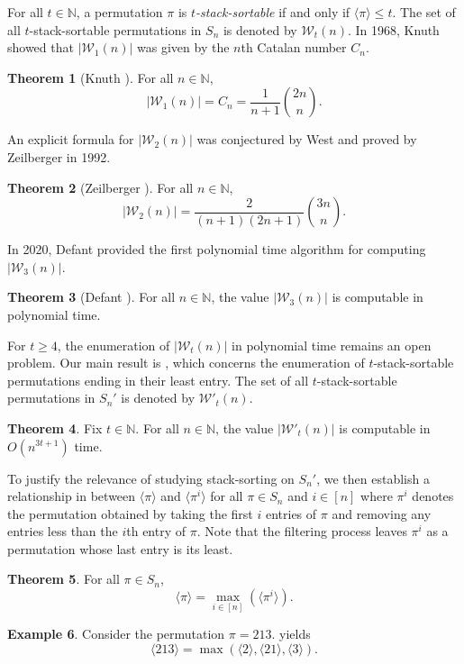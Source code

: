 \documentclass[12pt]{amsart}
\newcommand{\met}[1]{\langle #1\rangle}
\theoremstyle{definition}
\newtheorem{theorem}{Theorem}[section]
\newtheorem{example}[theorem]{Example}
\begin{document}
For all $t\in\mathbb{N}$, a permutation $\pi$ is \emph{$t$-stack-sortable} if and only if $\met{\pi}\le t$. The set of all $t$-stack-sortable permutations in $S_n$ is denoted by $\mathcal{W}_t(n)$. In 1968, Knuth showed that $|\mathcal{W}_1(n)|$ was given by the $n$th Catalan number $C_n$.
\begin{theorem}[Knuth \cite{knuth}]
For all $n\in\mathbb{N}$,
\[|\mathcal{W}_1(n)|=C_n=\frac{1}{n+1}\binom{2n}{n}.\]
\end{theorem}
An explicit formula for $|\mathcal{W}_2(n)|$ was conjectured by West and proved by Zeilberger in 1992.
\begin{theorem}[Zeilberger \cite{zeilberger}]
For all $n\in\mathbb{N}$,
\[|\mathcal{W}_2(n)|=\frac{2}{(n+1)(2n+1)}\binom{3n}{n}.\]
\end{theorem}
In 2020, Defant provided the first polynomial time algorithm for computing $|\mathcal{W}_3(n)|$.
\begin{theorem}[Defant \cite{defant}]
For all $n\in\mathbb{N}$, the value $|\mathcal{W}_3(n)|$ is computable in polynomial time.
\end{theorem}
For $t\ge 4$, the enumeration of $|\mathcal{W}_t(n)|$ in polynomial time remains an open problem. Our main result is , which concerns the enumeration of $t$-stack-sortable permutations ending in their least entry. The set of all $t$-stack-sortable permutations in $S_n'$ is denoted by $\mathcal{W}'_t(n)$.
\begin{theorem}\label{thm:result}
Fix $t\in\mathbb{N}$. For all $n\in\mathbb{N}$, the value $|\mathcal{W}'_t(n)|$ is computable in $O(n^{3t+1})$ time.
\end{theorem}
To justify the relevance of studying stack-sorting on $S_n'$, we then establish a relationship in  between $\met{\pi}$ and $\met{\pi^i}$ for all $\pi\in S_n$ and $i\in[n]$ where $\pi^i$ denotes the permutation obtained by taking the first $i$ entries of $\pi$ and removing any entries less than the $i$th entry of $\pi$. Note that the filtering process leaves $\pi^i$ as a permutation whose last entry is its least.
\begin{theorem}\label{thm:extensiontoSn}
For all $\pi\in S_n$, \[\met{\pi} = \max_{i\in [n]}(\met{\pi^i}).\]
\end{theorem}
\begin{example}
Consider the permutation $\pi=213$.  yields
\[\met{213} = \max(\met{2},\met{21},\met{3}).\]
\end{example}
\end{document}

